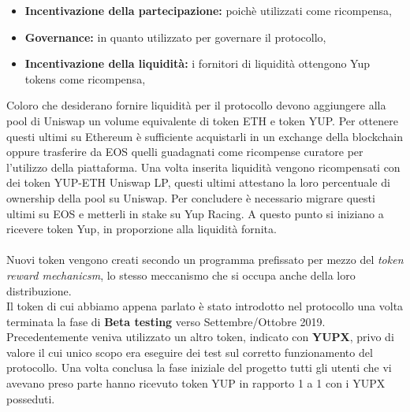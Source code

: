\begin{itemize}
    \item \textbf{Incentivazione della partecipazione:} poichè utilizzati come ricompensa,
    \item \textbf{Governance:} in quanto utilizzato per governare il protocollo,
    \item \textbf{Incentivazione della liquidità:} i fornitori di liquidità ottengono Yup tokens come ricompensa,
\end{itemize}

Coloro che desiderano fornire liquidità per il protocollo devono aggiungere alla pool di Uniswap un volume equivalente di token ETH e token YUP. Per ottenere questi ultimi su Ethereum è sufficiente acquistarli in un exchange della blockchain oppure trasferire da EOS quelli guadagnati come ricompense curatore per l'utilizzo della piattaforma. Una volta inserita liquidità vengono ricompensati con dei token YUP-ETH Uniswap LP, questi ultimi attestano la loro percentuale di ownership della pool su Uniswap. Per concludere è necessario migrare questi ultimi su EOS e metterli in stake su Yup Racing. A questo punto si iniziano a ricevere token Yup, in proporzione alla liquidità fornita.
\\
\\
Nuovi token vengono creati secondo un programma prefissato per mezzo del \textit{token reward mechanicsm}, lo stesso meccanismo che si occupa anche della loro distribuzione.
\\
Il token di cui abbiamo appena parlato è stato introdotto nel protocollo una volta terminata la fase di \textbf{Beta testing} verso Settembre/Ottobre 2019. Precedentemente veniva utilizzato un altro token, indicato con \textbf{YUPX}, privo di valore il cui unico scopo era eseguire dei test sul corretto funzionamento del protocollo. Una volta conclusa la fase iniziale del progetto tutti gli utenti che vi avevano preso parte hanno ricevuto token YUP in rapporto 1 a 1 con i YUPX posseduti.


